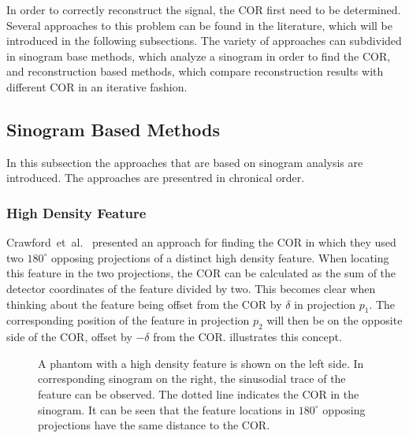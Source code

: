 \documentclass[10pt,journal,compsoc]{IEEEtran}
\begin{document}
In order to correctly reconstruct the signal, the COR first need to be determined.
Several approaches to this problem can be found in the literature, which will be introduced in the following subsections.
The variety of approaches can subdivided in sinogram base methods, which analyze a sinogram in order to find the COR, and reconstruction based methods, which compare reconstruction results with different COR in an iterative fashion.

\subsection{Sinogram Based Methods}
In this subsection the approaches that are based on sinogram analysis are introduced.
The approaches are presentred in chronical order.

\subsubsection{High Density Feature}\label{sssec:highdensityfeature}
Crawford~et~al.~\cite{crawford1988} presented an approach for finding the COR in which they used two $180^\circ$ opposing projections of a distinct high density feature.
When locating this feature in the two projections, the COR can be calculated as the sum of the detector coordinates of the feature divided by two.
This becomes clear when thinking about the feature being offset from the COR by $\delta$ in projection $p_1$.
The corresponding position of the feature in projection $p_2$ will then be on the opposite side of the COR, offset by $-\delta$ from the COR.  illustrates this concept.
%
\begin{figure}[!h]
\centering
{}
\hfil
{}
\caption{
A phantom with a high density feature is shown on the left side.
In corresponding sinogram on the right, the sinusodial trace of the feature can be observed.
The dotted line indicates the COR in the sinogram.
It can be seen that the feature locations in $180^\circ$ opposing projections have the same distance to the COR.  
}
\label{fig:highdenistyfeature}
\end{figure}
%
\end{document}

